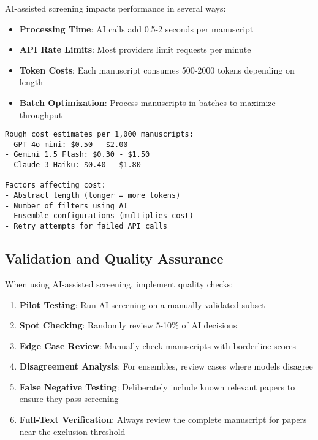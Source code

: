 AI-assisted screening impacts performance in several ways:

\begin{itemize}
    \item \textbf{Processing Time}: AI calls add 0.5-2 seconds per manuscript
    \item \textbf{API Rate Limits}: Most providers limit requests per minute
    \item \textbf{Token Costs}: Each manuscript consumes 500-2000 tokens depending on length
    \item \textbf{Batch Optimization}: Process manuscripts in batches to maximize throughput
\end{itemize}

\begin{warningbox}
\begin{lstlisting}
Rough cost estimates per 1,000 manuscripts:
- GPT-4o-mini: $0.50 - $2.00
- Gemini 1.5 Flash: $0.30 - $1.50
- Claude 3 Haiku: $0.40 - $1.80

Factors affecting cost:
- Abstract length (longer = more tokens)
- Number of filters using AI
- Ensemble configurations (multiplies cost)
- Retry attempts for failed API calls
\end{lstlisting}
\end{warningbox}

\subsection{Validation and Quality Assurance}


When using AI-assisted screening, implement quality checks:

\begin{enumerate}
    \item \textbf{Pilot Testing}: Run AI screening on a manually validated subset
    \item \textbf{Spot Checking}: Randomly review 5-10\% of AI decisions
    \item \textbf{Edge Case Review}: Manually check manuscripts with borderline scores
    \item \textbf{Disagreement Analysis}: For ensembles, review cases where models disagree
    \item \textbf{False Negative Testing}: Deliberately include known relevant papers to ensure they pass screening
    \item \textbf{Full-Text Verification}: Always review the complete manuscript for papers near the exclusion threshold
\end{enumerate}

